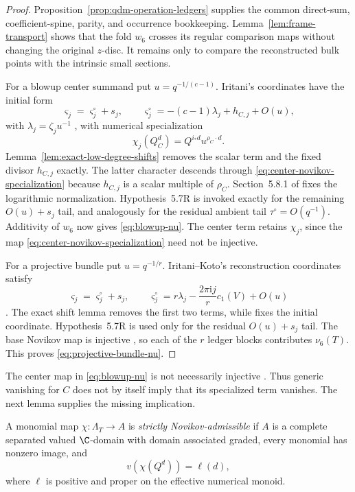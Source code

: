\begin{proof}
Proposition~\ref{prop:qdm-operation-ledgers} supplies the common direct-sum,
coefficient-spine, parity, and occurrence bookkeeping.
Lemma~\ref{lem:frame-transport} shows that the fold \(w_6\) crosses its regular
comparison maps without changing the original \(z\)-disc.  It remains only to
compare the reconstructed bulk points with the intrinsic small sections.

For a blowup center summand put \(u=q^{-1/(c-1)}\).  Iritani's coordinates
have the initial form
\[
 \varsigma_j=\varsigma_j^\circ+s_j,
 \qquad
 \varsigma_j^\circ=-(c-1)\lambda_j+h_{C,j}+O(u),
 \label{eq:blowup-reconstruction-coordinate}
\]
with $\lambda_j=\zeta_j u^{-1}$
\cite[Section~5.8.2 and (5.27)--(5.30)]{IritaniBlowup}, with numerical
specialization
\[
 \chi_j(Q_C^d)=Q^{i_*d}u^{\rho_C\cdot d}.
 \label{eq:center-novikov-specialization}
\]
Lemma~\ref{lem:exact-low-degree-shifts} removes the scalar term and the fixed
divisor \(h_{C,j}\) exactly.  The latter character descends through
\eqref{eq:center-novikov-specialization} because $h_{C,j}$ is a scalar
multiple of $\rho_C$.  Section~5.8.1 of \cite{IritaniBlowup} fixes the
logarithmic normalization.  Hypothesis~5.7R is invoked exactly for the
remaining \(O(u)+s_j\) tail, and analogously for the residual ambient tail
\(\tau^\circ=O(q^{-1})\).  Additivity of \(w_6\) now gives
\eqref{eq:blowup-nu}.  The center term retains \(\chi_j\), since the map
\eqref{eq:center-novikov-specialization} need not be injective.

For a projective bundle put \(u=q^{-1/r}\).  Iritani--Koto's reconstruction
coordinates satisfy
\[
 \varsigma_j=\varsigma_j^\circ+s_j,
 \qquad
 \varsigma_j^\circ
 =r\lambda_j-\frac{2\pi\mathrm{i}j}{r}c_1(V)+O(u)
\]
\cite[Theorem~5.1(4), Proposition~5.6]{IritaniKoto}.  The exact shift lemma
removes the first two terms, while \cite[(5.11)--(5.12)]{IritaniKoto} fixes
the initial coordinate.  Hypothesis~5.7R is used only for the residual
\(O(u)+s_j\) tail.  The base Novikov map is injective
\cite[(1.1) and Remark~5.2]{IritaniKoto}, so each of the \(r\) ledger blocks
contributes \(\nu_6(T)\).  This proves \eqref{eq:projective-bundle-nu}.
\end{proof}

The center map in \eqref{eq:blowup-nu} is not necessarily injective
\cite[(5.15)]{IritaniBlowup}.  Thus generic vanishing for \(C\) does not by
itself imply that its specialized term vanishes.  The next lemma supplies the
missing implication.

\begin{definition}
\label{def:strict-novikov-admissible}
%
%
A monomial map \(\chi:\Lambda_T\to A\) is \emph{strictly
Novikov-admissible} if \(A\) is a complete separated valued \(\C\)-domain
with domain associated graded, every monomial has nonzero image, and
\[
 v(\chi(Q^d))=\ell(d),
 \label{eq:strict-novikov-valuation}
\]
where \(\ell\) is positive and proper on the effective numerical monoid.
\end{definition}

